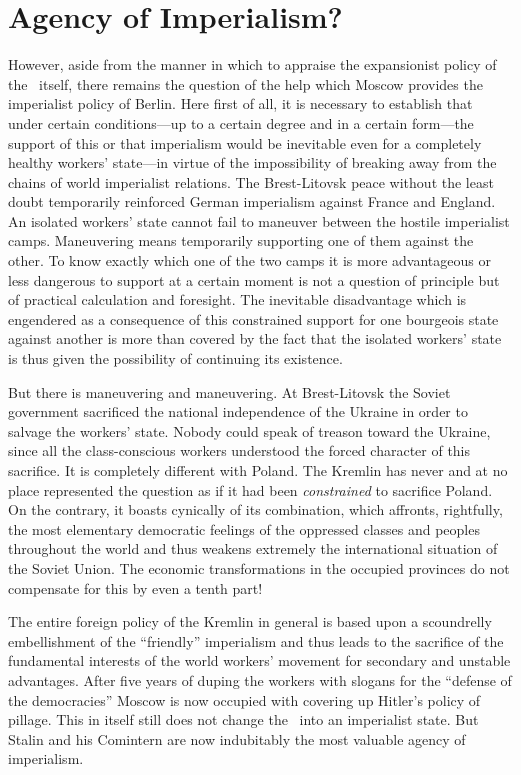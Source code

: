 \section*{Agency of Imperialism?}

However, aside from the manner in which to appraise the expansionist policy of the \USSR\ itself, there remains the question of the help which Moscow provides the imperialist policy of Berlin. Here first of all, it is necessary to establish that under certain conditions---up to a certain degree and in a certain form---the support of this or that imperialism would be inevitable even for a completely healthy workers’ state---in virtue of the impossibility of breaking away from the chains of world imperialist relations. The Brest-Litovsk peace without the least doubt temporarily reinforced German imperialism against France and England. An isolated workers’ state cannot fail to maneuver between the hostile imperialist camps. Maneuvering means temporarily supporting one of them against the other. To know exactly which one of the two camps it is more advantageous or less dangerous to support at a certain moment is not a question of principle but of practical calculation and foresight. The inevitable disadvantage which is engendered as a consequence of this constrained support for one bourgeois state against another is more than covered by the fact that the isolated workers’ state is thus given the possibility of continuing its existence.
\nowidow

But there is maneuvering and maneuvering. At Brest-Litovsk the Soviet government sacrificed the national independence of the Ukraine in order to salvage the workers’ state. Nobody could speak of treason toward the Ukraine, since all the class-conscious workers understood the forced character of this sacrifice. It is completely different with Poland. The Kremlin has never and at no place represented the question as if it had been \emph{constrained} to sacrifice Poland. On the contrary, it boasts cynically of its combination, which affronts, rightfully, the most elementary democratic feelings of the oppressed classes and peoples throughout the world and thus weakens extremely the international situation of the Soviet Union. The economic transformations in the occupied provinces do not compensate for this by even a tenth part!

The entire foreign policy of the Kremlin in general is based upon a scoun\-drel\-ly embellishment of the “friendly” imperialism and thus leads to the sacrifice of the fundamental interests of the world workers’ movement for secondary and unstable advantages. After five years of duping the workers with slogans for the “defense of the democracies” Moscow is now occupied with covering up Hitler’s policy of pillage. This in itself still does not change the \USSR\ into an imperialist state. But Stalin and his Comintern are now indubitably the most valuable agency of imperialism.

